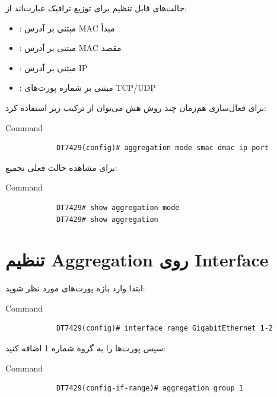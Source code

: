 \documentclass[11pt,letterpaper]{report}
\begin{document}
	حالت‌های قابل تنظیم برای توزیع ترافیک عبارت‌اند از:

	\begin{itemize}
		\item {}: مبتنی بر آدرس MAC مبدأ
		\item {}: مبتنی بر آدرس MAC مقصد
		\item {}: مبتنی بر آدرس IP
		\item {}: مبتنی بر شماره پورت‌های TCP/UDP
	\end{itemize}

	برای فعال‌سازی هم‌زمان چند روش هش می‌توان از ترکیب زیر استفاده کرد:

	\begin{latin}
		\begin{cliexample}{Command}
			\begin{verbatim}
			DT7429(config)# aggregation mode smac dmac ip port
			\end{verbatim}
		\end{cliexample}
	\end{latin}

	برای مشاهده حالت فعلی تجمیع:

	\begin{latin}
		\begin{cliexample}{Command}
			\begin{verbatim}
			DT7429# show aggregation mode
			DT7429# show aggregation
			\end{verbatim}
		\end{cliexample}
	\end{latin}


	\section{تنظیم Aggregation روی Interface}

	ابتدا وارد بازه پورت‌های مورد نظر شوید:

	\begin{latin}
		\begin{cliexample}{Command}
			\begin{verbatim}
			DT7429(config)# interface range GigabitEthernet 1-2
			\end{verbatim}
		\end{cliexample}
	\end{latin}

	سپس پورت‌ها را به گروه شماره 1 اضافه کنید:

	\begin{latin}
		\begin{cliexample}{Command}
			\begin{verbatim}
			DT7429(config-if-range)# aggregation group 1
			\end{verbatim}
		\end{cliexample}
	\end{latin}
\end{document}
